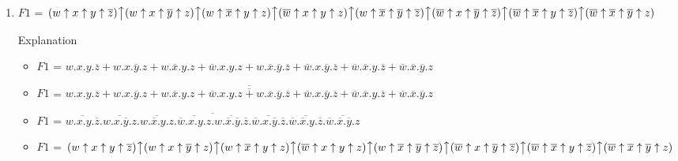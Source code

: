 \begin{enumerate}
\begin{itemize}
    \end{itemize}
 

    \item $F1$ = $(w\uparrow x\uparrow y\uparrow \overline{z})\big\uparrow (w\uparrow x\uparrow \overline{y}\uparrow z)\big\uparrow (w\uparrow \overline{x}\uparrow y\uparrow z)\big\uparrow (\overline{w}\uparrow x\uparrow y\uparrow z)\big\uparrow (w\uparrow \overline{x}\uparrow \overline{y}\uparrow \overline{z})\big\uparrow (\overline{w}\uparrow x\uparrow \overline{y}\uparrow \overline{z})\big\uparrow (\overline{w}\uparrow \overline{x}\uparrow y\uparrow \overline{z})\big\uparrow (\overline{w}\uparrow \overline{x}\uparrow \overline{y}\uparrow z)$

    Explanation
    \begin{itemize}
        \item $F1$ = $ w.x.y.\overline{z} + w.x.\overline{y}.z + w.\overline{x}.y.z + \overline{w}.x.y.z + w.\overline{x}.\overline{y}.\overline{z} + \overline{w}.x.\overline{y}.\overline{z} + \overline{w}.\overline{x}.y.\overline{z} + \overline{w}.\overline{x}.\overline{y}.z $

        
            \item  $F1$ = $\overline{\overline{ w.x.y.\overline{z} + w.x.\overline{y}.z + w.\overline{x}.y.z + \overline{w}.x.y.z + w.\overline{x}.\overline{y}.\overline{z} + \overline{w}.x.\overline{y}.\overline{z} + \overline{w}.\overline{x}.y.\overline{z} + \overline{w}.\overline{x}.\overline{y}.z }}$
        
            \item  $F1$ = $\overline{\overline{ w.x.y.\overline{z} }.\overline{ w.x.\overline{y}.z }.\overline{ w.\overline{x}.y.z }.\overline{ \overline{w}.x.y.z }.\overline{ w.\overline{x}.\overline{y}.\overline{z} }.\overline{ \overline{w}.x.\overline{y}.\overline{z} }.\overline{ \overline{w}.\overline{x}.y.\overline{z} }.\overline{ \overline{w}.\overline{x}.\overline{y}.z }}$
        
            \item  $F1$ = $(w\uparrow x\uparrow y\uparrow \overline{z})\big\uparrow (w\uparrow x\uparrow \overline{y}\uparrow z)\big\uparrow (w\uparrow \overline{x}\uparrow y\uparrow z)\big\uparrow (\overline{w}\uparrow x\uparrow y\uparrow z)\big\uparrow (w\uparrow \overline{x}\uparrow \overline{y}\uparrow \overline{z})\big\uparrow (\overline{w}\uparrow x\uparrow \overline{y}\uparrow \overline{z})\big\uparrow (\overline{w}\uparrow \overline{x}\uparrow y\uparrow \overline{z})\big\uparrow (\overline{w}\uparrow \overline{x}\uparrow \overline{y}\uparrow z)$
        

\end{itemize}
\end{enumerate}

